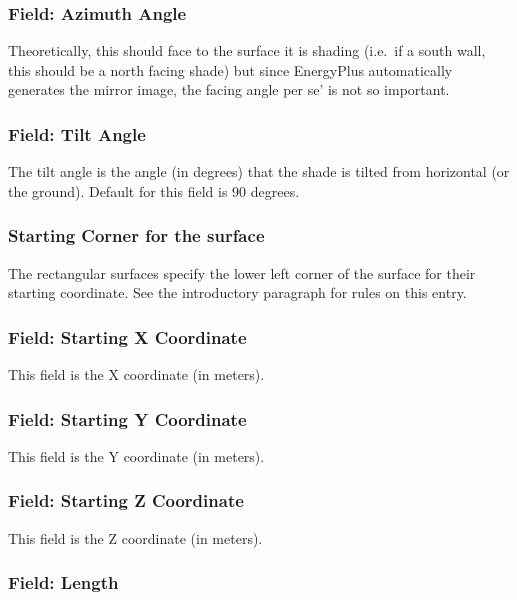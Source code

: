 \subsubsection{Field: Azimuth Angle}\label{field-azimuth-angle-10}

Theoretically, this should face to the surface it is shading (i.e.~if a south wall, this should be a north facing shade) but since EnergyPlus automatically generates the mirror image, the facing angle per se' is not so important.

\subsubsection{Field: Tilt Angle}\label{field-tilt-angle-10}

The tilt angle is the angle (in degrees) that the shade is tilted from horizontal (or the ground). Default for this field is 90 degrees.

\subsubsection{Starting Corner for the surface}\label{starting-corner-for-the-surface-16}

The rectangular surfaces specify the lower left corner of the surface for their starting coordinate. See the introductory paragraph for rules on this entry.

\subsubsection{Field: Starting X Coordinate}\label{field-starting-x-coordinate-16}

This field is the X coordinate (in meters).

\subsubsection{Field: Starting Y Coordinate}\label{field-starting-y-coordinate-10}

This field is the Y coordinate (in meters).

\subsubsection{Field: Starting Z Coordinate}\label{field-starting-z-coordinate-16}

This field is the Z coordinate (in meters).

\subsubsection{Field: Length}\label{field-length-16}

